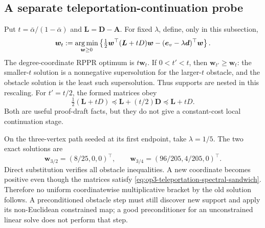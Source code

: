 \subsection{A separate teleportation-continuation probe}
\label{subsec:op3-teleportation-probe}

Put $t=\bar\alpha/(1-\bar\alpha)$ and $\bm L=\bm D-\bm A$. For fixed $\lambda$,
define, only in this subsection,
\[
 \bm w_t:=\operatorname*{arg\,min}_{\bm w\geq0}
 \left\{\tfrac12\bm w^\top(\bm L+tD)\bm w
                  -(\bm e_v-\lambda\bm d)^\top\bm w\right\}.
\]
The degree-coordinate RPPR optimum is $t\bm w_t$. If $0<t'<t$, then
$\bm w_{t'}\geq\bm w_t$: the smaller-$t$ solution is a nonnegative
supersolution for the larger-$t$ obstacle, and the obstacle solution is the
least such supersolution. Thus supports are nested in this rescaling.
For $t'=t/2$, the formed matrices obey
\begin{equation}
 \tfrac12(\bm L+tD)\preceq \bm L+(t/2)\bm D\preceq \bm L+tD.
 \label{eq:op3-teleportation-spectral-sandwich}
\end{equation}
Both are useful \statusproved{} proof-draft facts, but they do not give a
constant-cost local continuation stage.

On the three-vertex path seeded at its first endpoint, take $\lambda=1/5$.
The two exact solutions are
\[
 \bm w_{3/2}=(8/25,0,0)^\top,\qquad
 \bm w_{3/4}=(96/205,4/205,0)^\top.
\]
Direct substitution verifies all obstacle inequalities. A new coordinate
becomes positive even though the matrices satisfy
\cref{eq:op3-teleportation-spectral-sandwich}. Therefore no uniform
coordinatewise multiplicative bracket by the old solution follows. A
preconditioned obstacle step must still discover new support and apply its
non-Euclidean constrained map; a good preconditioner for an unconstrained
linear solve does not perform that step.
